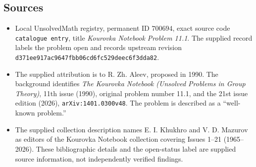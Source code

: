 \documentclass[11pt]{article}
\begin{document}
\subsection{Sources}
\begin{itemize}
\item Local UnsolvedMath registry, permanent ID \(700694\), exact source code \texttt{catalogue entry}, title \emph{Kourovka Notebook Problem 11.1}. The supplied record labels the problem open and records upstream revision \texttt{d371ee917ac9647fbb06cd6fc529deec6f3dda82}.
\item The supplied attribution is to R. Zh. Aleev, proposed in 1990. The background identifies \emph{The Kourovka Notebook (Unsolved Problems in Group Theory)}, 11th issue (1990), original problem number 11.1, and the 21st issue edition (2026), \texttt{arXiv:1401.0300v48}. The problem is described as a ``well-known problem.''
\item The supplied collection description names E. I. Khukhro and V. D. Mazurov as editors of the Kourovka Notebook collection covering Issues 1--21 (1965--2026). These bibliographic details and the open-status label are supplied source information, not independently verified findings.
\end{itemize}
\end{document}
